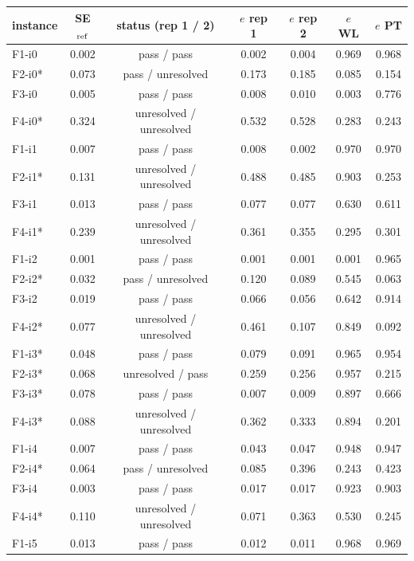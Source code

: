 \begin{tabular}{lcccccc}
\toprule
instance & SE$_{\rm ref}$ & status (rep 1 / 2) & $e$ rep 1 & $e$ rep 2 & $e$ WL & $e$ PT \\
\midrule
F1-i0 & 0.002 & pass / pass & 0.002 & 0.004 & 0.969 & 0.968 \\
F2-i0* & 0.073 & pass / unresolved & 0.173 & 0.185 & 0.085 & 0.154 \\
F3-i0 & 0.005 & pass / pass & 0.008 & 0.010 & 0.003 & 0.776 \\
F4-i0* & 0.324 & unresolved / unresolved & 0.532 & 0.528 & 0.283 & 0.243 \\
F1-i1 & 0.007 & pass / pass & 0.008 & 0.002 & 0.970 & 0.970 \\
F2-i1* & 0.131 & unresolved / unresolved & 0.488 & 0.485 & 0.903 & 0.253 \\
F3-i1 & 0.013 & pass / pass & 0.077 & 0.077 & 0.630 & 0.611 \\
F4-i1* & 0.239 & unresolved / unresolved & 0.361 & 0.355 & 0.295 & 0.301 \\
F1-i2 & 0.001 & pass / pass & 0.001 & 0.001 & 0.001 & 0.965 \\
F2-i2* & 0.032 & pass / unresolved & 0.120 & 0.089 & 0.545 & 0.063 \\
F3-i2 & 0.019 & pass / pass & 0.066 & 0.056 & 0.642 & 0.914 \\
F4-i2* & 0.077 & unresolved / unresolved & 0.461 & 0.107 & 0.849 & 0.092 \\
F1-i3* & 0.048 & pass / pass & 0.079 & 0.091 & 0.965 & 0.954 \\
F2-i3* & 0.068 & unresolved / pass & 0.259 & 0.256 & 0.957 & 0.215 \\
F3-i3* & 0.078 & pass / pass & 0.007 & 0.009 & 0.897 & 0.666 \\
F4-i3* & 0.088 & unresolved / unresolved & 0.362 & 0.333 & 0.894 & 0.201 \\
F1-i4 & 0.007 & pass / pass & 0.043 & 0.047 & 0.948 & 0.947 \\
F2-i4* & 0.064 & pass / unresolved & 0.085 & 0.396 & 0.243 & 0.423 \\
F3-i4 & 0.003 & pass / pass & 0.017 & 0.017 & 0.923 & 0.903 \\
F4-i4* & 0.110 & unresolved / unresolved & 0.071 & 0.363 & 0.530 & 0.245 \\
F1-i5 & 0.013 & pass / pass & 0.012 & 0.011 & 0.968 & 0.969 \\

\end{tabular}
